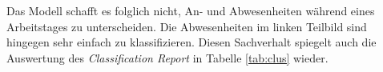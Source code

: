 Das Modell schafft es folglich nicht, An- und Abwesenheiten während eines Arbeitstages zu unterscheiden. 
Die Abwesenheiten im linken Teilbild sind hingegen sehr einfach zu klassifizieren.
Diesen Sachverhalt spiegelt auch die Auswertung des \textit{Classification Report} in Tabelle \ref{tab:clus} 
wieder.\\

